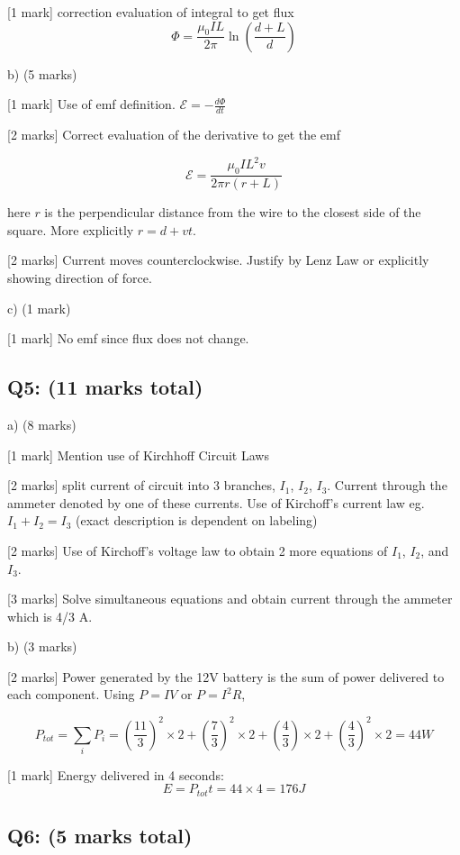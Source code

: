 \documentclass[a4paper,11pt]{article}
\begin{document}
[1 mark] correction evaluation of integral to get flux
\[ \Phi = \frac{\mu_0 I L}{2\pi}\ln\left ( \frac{d+L}{d} \right ) \]

b) (5 marks)

[1 mark] Use of emf definition.  \( \mathcal{E} = - \frac{d\Phi}{dt} \)

[2 marks] Correct evaluation of the derivative to get the emf

\[ \mathcal{E} = \frac{\mu_0 I L^2 v}{2\pi r (r+L)} \]

here \( r \) is the perpendicular distance from the wire to the closest side of the square. More explicitly \( r = d + vt \).

[2 marks] Current moves counterclockwise. Justify by Lenz Law or explicitly showing direction of force.

c) (1 mark)

[1 mark] No emf since flux does not change.

\subsection*{Q5: (11 marks total)}

a) (8 marks)

[1 mark] Mention use of Kirchhoff Circuit Laws 

[2 marks] split current of circuit into 3 branches, \( I_1 \), \( I_2 \), \( I_3 \). Current through the ammeter denoted by one of these currents. Use of Kirchoff’s current law eg. \( I_1 + I_2 = I_3 \) (exact description is dependent on labeling)

[2 marks] Use of Kirchoff’s voltage law to obtain 2 more equations of  \( I_1 \), \( I_2 \), and \( I_3 \).

[3 marks] Solve simultaneous equations and obtain current through the ammeter which is 4/3 A. 

b)  (3 marks)

[2 marks] Power generated by the 12V battery is the sum of power delivered to each component. Using \( P = IV \) or \( P = I^2 R \),

\[ P_{tot} = \sum_{i} P_i = \left ( \frac{11}{3} \right )^2 \times 2 + \left ( \frac{7}{3} \right )^2 \times 2 + \left ( \frac{4}{3} \right ) \times 2 + \left ( \frac{4}{3} \right )^2 \times 2 = 44 W \]

[1 mark] Energy delivered in 4 seconds: 
\[ E = P_{tot} t = 44 \times 4 = 176 J \]

\subsection*{Q6: (5 marks total)}
\end{document}
